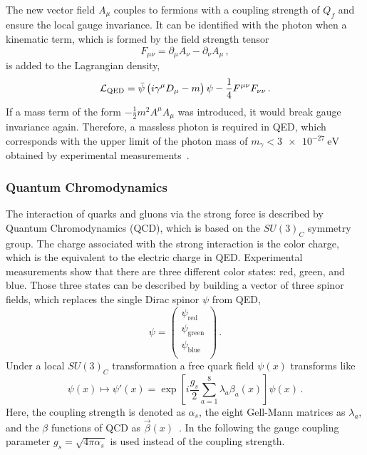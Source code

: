 The new vector field $A_\mu$ couples to fermions with a coupling strength of $Q_f$ and ensure the local gauge invariance.
It can be identified with the photon when a kinematic term, which is formed by the field strength tensor
\begin{equation}
    F_{\mu \nu} = \partial_\mu A_\nu - \partial_\nu A_\mu \,,
\end{equation}
is added to the Lagrangian density,
\begin{equation}
    \mathcal{L}_\text{QED} = \bar{\psi} \left( i \gamma^\mu D_\mu -m \right) \psi - \frac{1}{4} F^{\mu\nu} F_{\nu\nu} \,.
\end{equation}
If a mass term of the form $-\frac{1}{2}m^2 A^\mu A_\mu $ was introduced, it would break gauge invariance again.
Therefore, a massless photon is required in QED, which corresponds with the upper limit of the photon mass of $m_\gamma < \SI{3e-27}{\eV}$
obtained by experimental measurements~\cite{PhotonMass}.

\subsubsection{Quantum Chromodynamics}

The interaction of quarks and gluons via the strong force is described by Quantum Chromodynamics (QCD), which is based on the $SU(3)_C$ symmetry group.
The charge associated with the strong interaction is the color charge, which is the equivalent to the electric charge in QED\@.
Experimental measurements show that there are three different color states: red, green, and blue.
Those three states can be described by building a vector of three spinor fields, which replaces the single Dirac spinor $\psi$ from QED,
\begin{equation}
    \psi =
    \begin{pmatrix}
        \psi_\text{red} \\
        \psi_\text{green} \\
        \psi_\text{blue} \\
    \end{pmatrix} \,.
\end{equation}
Under a local $SU(3)_C$ transformation a free quark field $\psi(x)$ transforms like
\begin{equation}
    \psi(x) \mapsto \psi'(x) = \exp \left[ i \frac{g_s}{2} \sum_{a=1}^8 \lambda_a \beta_a (x) \right] \psi(x) \,.
\end{equation}
Here, the coupling strength is denoted as $\alpha_s$, the eight Gell-Mann matrices as $\lambda_a$, and the $\beta$ functions of QCD as $\vec{\beta}(x)$~\cite{Schmuser}.
In the following the gauge coupling parameter $g_s = \sqrt{4 \pi \alpha_s}$ is used instead of the coupling strength.

